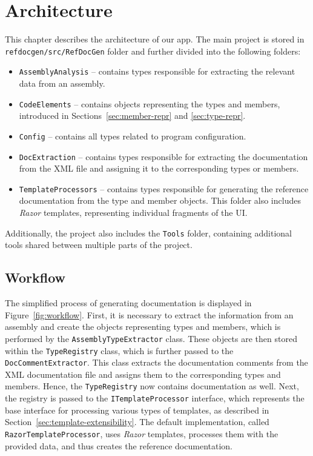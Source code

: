 \chapter{Architecture}

This chapter describes the architecture of our app.
The main project is stored in \texttt{refdocgen/src/RefDocGen} folder and further divided into the following folders:

\begin{itemize}
    \item \texttt{AssemblyAnalysis} -- contains types responsible for extracting the relevant data from an assembly.
    \item \texttt{CodeElements} -- contains objects representing the types and members, introduced in Sections~\ref{sec:member-repr} and \ref{sec:type-repr}.
    \item \texttt{Config} -- contains all types related to program configuration.
    \item \texttt{DocExtraction} -- contains types responsible for extracting the documentation from the XML file and assigning it to the corresponding types or members.
    \item \texttt{TemplateProcessors} -- contains types responsible for generating the reference documentation from the type and member objects.
    This folder also includes \textit{Razor} templates, representing individual fragments of the UI.
\end{itemize}

Additionally, the project also includes the \texttt{Tools} folder, containing additional tools shared between multiple parts of the project.

\section{Workflow}
\label{sec:workflow}

The simplified process of generating documentation is displayed in Figure~\ref{fig:workflow}.
First, it is necessary to extract the information from an assembly and create the objects representing types and members, which is performed by the \texttt{AssemblyTypeExtractor} class.
These objects are then stored within the \linebreak \texttt{TypeRegistry} class, which is further passed to the \texttt{DocCommentExtractor}.
This class extracts the documentation comments from the XML documentation file and assigns them to the corresponding types and members.
Hence, the \texttt{TypeRegistry} now contains documentation as well.
Next, the registry is passed to the \linebreak \texttt{ITemplateProcessor} interface, which represents the base interface for processing various types of templates, as described in Section~\ref{sec:template-extensibility}.
The default implementation, called \texttt{RazorTemplateProcessor}, uses \textit{Razor} templates, processes them with the provided data, and thus creates the reference documentation.

